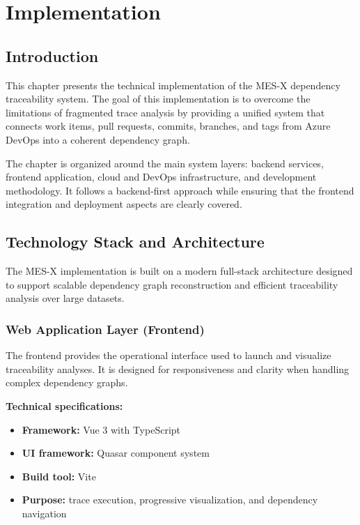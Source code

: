 \chapter{Implementation}

\section{Introduction}

This chapter presents the technical implementation of the MES-X dependency
traceability system. The goal of this implementation is to overcome the
limitations of fragmented trace analysis by providing a unified system that
connects work items, pull requests, commits, branches, and tags from Azure
DevOps into a coherent dependency graph.

The chapter is organized around the main system layers: backend services,
frontend application, cloud and DevOps infrastructure, and development
methodology. It follows a backend-first approach while ensuring that the
frontend integration and deployment aspects are clearly covered.

\section{Technology Stack and Architecture}

The MES-X implementation is built on a modern full-stack architecture designed
to support scalable dependency graph reconstruction and efficient traceability
analysis over large datasets.

\subsection{Web Application Layer (Frontend)}

The frontend provides the operational interface used to launch and visualize
traceability analyses. It is designed for responsiveness and clarity when
handling complex dependency graphs.

\textbf{Technical specifications:}
\begin{itemize}
  \item \textbf{Framework:} Vue 3 with TypeScript
  \item \textbf{UI framework:} Quasar component system
  \item \textbf{Build tool:} Vite
  \item \textbf{Purpose:} trace execution, progressive visualization, and dependency navigation
\end{itemize}

